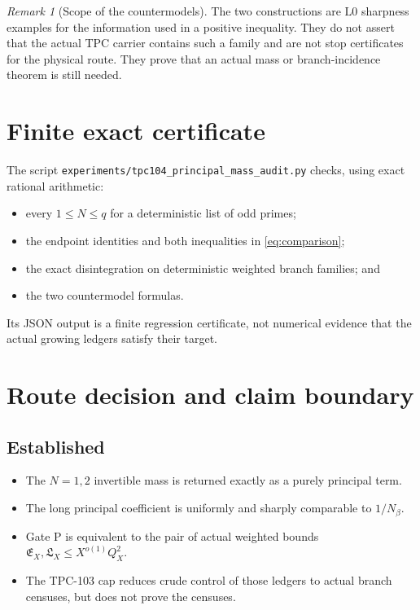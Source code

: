 \documentclass[11pt]{article}
\theoremstyle{definition}
\theoremstyle{remark}
\newtheorem{remark}[theorem]{Remark}
\newcommand{\Lzero}{\mathrm{L0}}
\newcommand{\EX}{\mathfrak E_X}
\newcommand{\LX}{\mathfrak L_X}
\begin{document}
\begin{remark}[Scope of the countermodels]
The two constructions are \(\Lzero\) sharpness examples for the
information used in a positive inequality.  They do not assert
that the actual TPC carrier contains such a family and are not stop
certificates for the physical route.  They prove that an actual
mass or branch-incidence theorem is still needed.
\end{remark}

\section{Finite exact certificate}
\label{sec:certificate}

The script
\texttt{experiments/tpc104\_principal\_mass\_audit.py} checks, using
exact rational arithmetic:
\begin{itemize}[leftmargin=2em]
\item every \(1\le N\le q\) for a deterministic list of odd
primes;
\item the endpoint identities and both inequalities in
\eqref{eq:comparison};
\item the exact disintegration on deterministic weighted branch
families; and
\item the two countermodel formulas.
\end{itemize}
Its JSON output is a finite regression certificate, not numerical
evidence that the actual growing ledgers satisfy their target.

\section{Route decision and claim boundary}
\label{sec:boundary}

\subsection*{Established}

\begin{itemize}[leftmargin=2em]
\item The \(N=1,2\) invertible mass is returned exactly as a purely
principal term.
\item The long principal coefficient is uniformly and sharply
comparable to \(1/N_\beta\).
\item Gate P is equivalent to the pair of actual weighted bounds
\(\EX,\LX\le X^{o(1)}Q_X^2\).
\item The TPC-103 cap reduces crude control of those ledgers to
actual branch censuses, but does not prove the censuses.
\end{itemize}
\end{document}
